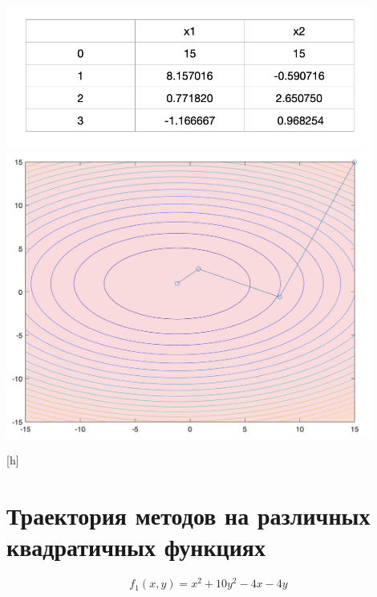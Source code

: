 \documentclass[a4paper,12pt]{article}
\begin{document}
\begin{center}
    \includegraphics[width=120mm]{table_3.png}
    \includegraphics[width=120mm]{plot_3.png}
\end{center}[h]

\clearpage

\section{Траектория методов на различных квадратичных функциях}

\begin{equation*}
    f_1(x, y) = x^2 + 10y^2 - 4x - 4y
\end{equation*}
\end{document}
